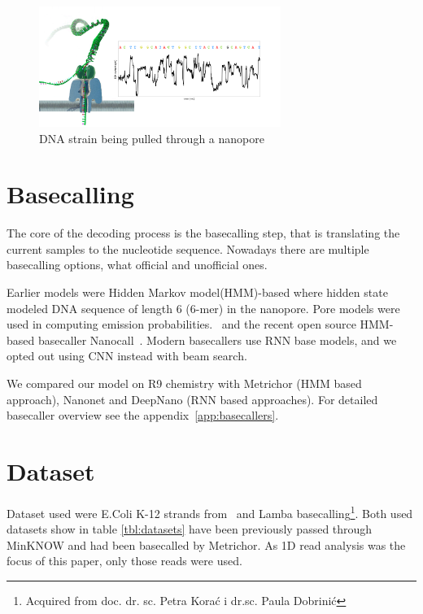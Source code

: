 \documentclass[runningheads,a4paper]{llncs}
\begin{document}
\begin{figure}[!ht]
	\begin{center}
		\includegraphics[width=0.7\textwidth]{./imgs/nanopore.png}
		\caption[DNA strain being pulled through a nanopore]{DNA strain being pulled through a nanopore \protect\footnotemark}
		\label{fg:nanopore}
	\end{center}
\end{figure}

\section{Basecalling}
The core of the decoding process is the basecalling step, that is translating the current samples to the nucleotide sequence. Nowadays there are multiple basecalling options, what official and unofficial ones.

Earlier models were Hidden Markov model(HMM)-based where hidden state modeled DNA sequence of length 6 (6-mer) in the nanopore. Pore models were used in computing emission probabilities.~\cite{loman2015complete,schreiber2015analysis,szalay2015novo,timp2012dna} and the recent open source HMM-based basecaller Nanocall~\cite{david2016nanocall}. Modern basecallers use RNN base models, and we opted out using CNN instead with beam search.

We compared our model on R9 chemistry with Metrichor (HMM based approach), Nanonet and DeepNano (RNN based approaches). For detailed basecaller overview see the appendix~\ref{app:basecallers}.


\section{Dataset}

Dataset used were E.Coli K-12 strands from~\cite{loman1-100k} and Lamba basecalling\footnote{Acquired from doc. dr. sc. Petra Korać i dr.sc. Paula Dobrinić}. Both used datasets show in table \ref{tbl:datasets} have been previously passed through MinKNOW and had been basecalled by Metrichor. As 1D read analysis was the focus of this paper, only those reads were used.
\end{document}
